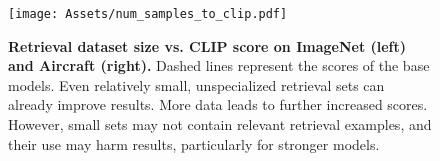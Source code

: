 \begin{figure}[htp]
  \centering
   \texttt{[image: Assets/num\_samples\_to\_clip.pdf]}
   \caption{\textbf{Retrieval dataset size vs. CLIP score on ImageNet (left) and Aircraft (right).} 
   Dashed lines represent the scores of the base models.
   Even relatively small, unspecialized retrieval sets can already improve results. More data leads to further increased scores. However, small sets may not contain relevant retrieval examples, and their use may harm results, particularly for stronger models.
   }
   \label{fig:samples_to_score}
\end{figure}